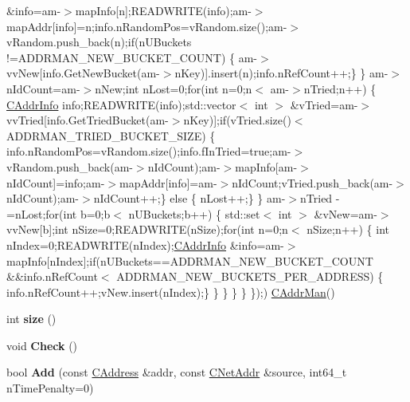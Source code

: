 \begin{DoxyCompactItemize}
\&info=am-\/$>$map\+Info\mbox{[}n\mbox{]};R\+E\+A\+D\+W\+R\+I\+TE(info);am-\/$>$map\+Addr\mbox{[}info\mbox{]}=n;info.\+n\+Random\+Pos=v\+Random.\+size();am-\/$>$v\+Random.\+push\+\_\+back(n);if(n\+U\+Buckets !=A\+D\+D\+R\+M\+A\+N\+\_\+\+N\+E\+W\+\_\+\+B\+U\+C\+K\+E\+T\+\_\+\+C\+O\+U\+NT) \{ am-\/$>$vv\+New\mbox{[}info.\+Get\+New\+Bucket(am-\/$>$n\+Key)\mbox{]}.insert(n);info.\+n\+Ref\+Count++;\} \} am-\/$>$n\+Id\+Count=am-\/$>$n\+New;int n\+Lost=0;for(int n=0;n$<$ am-\/$>$n\+Tried;n++) \{ \mbox{\hyperlink{class_c_addr_info}{C\+Addr\+Info}} info;R\+E\+A\+D\+W\+R\+I\+TE(info);std\+::vector$<$ int $>$ \&v\+Tried=am-\/$>$vv\+Tried\mbox{[}info.\+Get\+Tried\+Bucket(am-\/$>$n\+Key)\mbox{]};if(v\+Tried.\+size()$<$ A\+D\+D\+R\+M\+A\+N\+\_\+\+T\+R\+I\+E\+D\+\_\+\+B\+U\+C\+K\+E\+T\+\_\+\+S\+I\+ZE) \{ info.\+n\+Random\+Pos=v\+Random.\+size();info.\+f\+In\+Tried=true;am-\/$>$v\+Random.\+push\+\_\+back(am-\/$>$n\+Id\+Count);am-\/$>$map\+Info\mbox{[}am-\/$>$n\+Id\+Count\mbox{]}=info;am-\/$>$map\+Addr\mbox{[}info\mbox{]}=am-\/$>$n\+Id\+Count;v\+Tried.\+push\+\_\+back(am-\/$>$n\+Id\+Count);am-\/$>$n\+Id\+Count++;\} else \{ n\+Lost++;\} \} am-\/$>$n\+Tried -\/=n\+Lost;for(int b=0;b$<$ n\+U\+Buckets;b++) \{ std\+::set$<$ int $>$ \&v\+New=am-\/$>$vv\+New\mbox{[}b\mbox{]};int n\+Size=0;R\+E\+A\+D\+W\+R\+I\+TE(n\+Size);for(int n=0;n$<$ n\+Size;n++) \{ int n\+Index=0;R\+E\+A\+D\+W\+R\+I\+TE(n\+Index);\mbox{\hyperlink{class_c_addr_info}{C\+Addr\+Info}} \&info=am-\/$>$map\+Info\mbox{[}n\+Index\mbox{]};if(n\+U\+Buckets==A\+D\+D\+R\+M\+A\+N\+\_\+\+N\+E\+W\+\_\+\+B\+U\+C\+K\+E\+T\+\_\+\+C\+O\+U\+NT \&\&info.\+n\+Ref\+Count$<$ A\+D\+D\+R\+M\+A\+N\+\_\+\+N\+E\+W\+\_\+\+B\+U\+C\+K\+E\+T\+S\+\_\+\+P\+E\+R\+\_\+\+A\+D\+D\+R\+E\+SS) \{ info.\+n\+Ref\+Count++;v\+New.\+insert(n\+Index);\} \} \} \} \} \});) \mbox{\hyperlink{class_c_addr_man}{C\+Addr\+Man}}()
\item 
\mbox{\label{class_c_addr_man_a15b8e72f55344b6fbd1bc1bda3cdc5bc}} 
int {\bfseries size} ()
\item 
\mbox{\label{class_c_addr_man_a0c2677ae50ce0d680f0105b285d1f5d0}} 
void {\bfseries Check} ()
\item 
\mbox{\label{class_c_addr_man_a03fcc7109b5f014760dc50a81f68c5ec}} 
bool {\bfseries Add} (const \mbox{\hyperlink{class_c_address}{C\+Address}} \&addr, const \mbox{\hyperlink{class_c_net_addr}{C\+Net\+Addr}} \&source, int64\+\_\+t n\+Time\+Penalty=0)

\end{DoxyCompactItemize}
